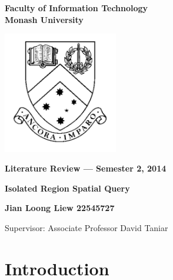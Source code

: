 \documentclass[a4paper,11pt]{article}
\begin{document}
\thispagestyle{empty} %
\renewcommand{\thepage}{\roman{page}}

\begin{spacing}{1.5}
\begin{center}
{\Large \bfseries
Faculty of Information Technology\\
Monash University}

\vspace*{30mm}

\includegraphics[width=5cm]{MonashCrest}

\vspace*{15mm}

{\large \bfseries
Literature Review --- Semester 2, 2014
}

\vspace*{10mm}

{\LARGE \bfseries
Isolated Region Spatial Query
}

\vspace*{20mm}

{\large \bfseries
Jian Loong Liew 22545727

\vspace*{20mm}

Supervisor: Associate Professor David Taniar
}

\end{center}
\end{spacing}

\newpage

\tableofcontents

\newpage
\setcounter{page}{1}
\renewcommand{\thepage}{\arabic{page}}

\section{Introduction} 
\end{document}
